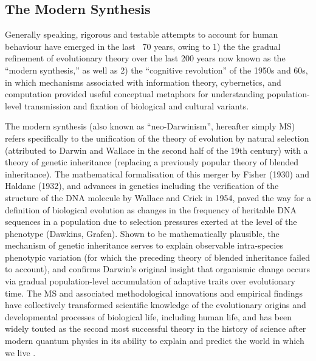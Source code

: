 
\subsection{The Modern Synthesis}
Generally speaking, rigorous and testable attempts to account for human behaviour have emerged in the last ~70 years, owing to 1) the the gradual refinement of evolutionary theory over the last 200 years now known as the ``modern synthesis,'' as well as 2) the ``cognitive revolution'' of the 1950s and 60s, in which mechanisms associated with information theory, cybernetics, and computation provided useful conceptual metaphors for understanding population-level transmission and fixation of biological and cultural variants.

The modern synthesis (also known as ``neo-Darwinism'', hereafter simply MS) refers specifically to the unification of the theory of evolution by natural selection (attributed to Darwin and Wallace in the second half of the 19th century) with a theory of genetic inheritance (replacing a previously popular theory of blended inheritance).  The mathematical formalisation of this merger by Fisher (1930) and Haldane (1932), and advances in genetics including the verification of the structure of the DNA molecule by Wallace and Crick in 1954, paved the way for a definition of biological evolution as changes in the frequency of heritable DNA sequences in a population due to selection pressures exerted at the level of the phenotype (Dawkins, Grafen).  Shown to be mathematically plausible, the mechanism of genetic inheritance serves to explain observable intra-species phenotypic variation (for which the preceding theory of blended inheritance failed to account), and confirms Darwin's original insight that organismic change occurs via gradual population-level accumulation of adaptive traits over evolutionary time. The MS and associated methodological innovations and empirical findings have collectively transformed scientific knowledge of the evolutionary origins and developmental processes of biological life, including human life, and has been widely touted as the second most successful theory in the history of science after modern quantum physics in its ability to explain and predict the world in which we live \citep{Dunbar1996}.

